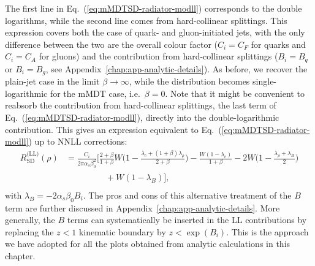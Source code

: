 %
The first line in Eq.~(\ref{eq:mMDTSD-radiator-modll}) corresponds to
the double logarithms, while the second line comes from hard-collinear
splittings.
%
This expression covers both the case of quark- and gluon-initiated
jets, with the only difference between the two are the overall colour
factor ($C_i=C_F$ for quarks and $C_i=C_A$ for gluons) and the
contribution from hard-collinear splittings ($B_i=B_q$ or $B_i=B_g$,
see Appendix~\ref{chap:app-analytic-details}).
%
As before, we recover the plain-jet case in the limit
$\beta\to\infty$, while the distribution becomes single-logarithmic
for the mMDT case, i.e.\ $\beta=0$.
%
Note that it might be convenient to reabsorb the contribution
from hard-collinear splittings, the last term
of Eq.~(\ref{eq:mMDTSD-radiator-modll}), directly into the
double-logarithmic contribution. This gives an expression equivalent
to Eq.~(\ref{eq:mMDTSD-radiator-modll}) up to NNLL corrections:
\begin{align}\label{eq:mMDTSD-radiator-modll-altB}
  R_{\text{SD}}^{\text{(LL)}}(\rho)
    & = \frac{C_i}{2\pi\alpha_s\beta_0^2}
      \bigg[\frac{2+\beta}{1+\beta}W\Big(1-\frac{\lambda_c+(1+\beta)\lambda_\rho}{2+\beta}\Big)
      -\frac{W(1-\lambda_c)}{1+\beta}-2W\Big(1-\frac{\lambda_\rho+\lambda_B}{2}\Big)\nonumber\\
    & \phantom{=\frac{C_i}{2\pi\alpha_s\beta_0^2} \quad}
      +W(1-\lambda_B)\bigg],
\end{align}
with $\lambda_B=-2\alpha_s\beta_0B_i$. 
%
The pros and cons of this alternative treatment of the $B$ term are
further discussed in Appendix~\ref{chap:app-analytic-details}.
%
More generally, the $B$ terms can systematically be inserted in the LL
contributions by replacing the $z<1$ kinematic boundary by
$z<\exp(B_i)$.
%
This is the approach we have adopted for all the plots obtained from
analytic calculations in this chapter.


